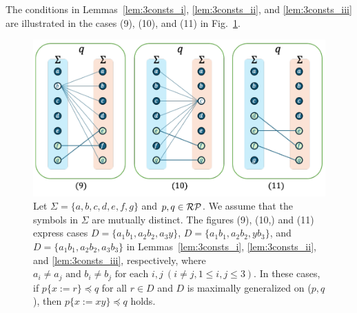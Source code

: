 The conditions in Lemmas~\ref{lem:3consts_i}, \ref{lem:3consts_ii}, and \ref{lem:3consts_iii} are illustrated in the cases (9), (10), and (11) in Fig.~\ref{fig:lem7bigraph}.

\begin{figure}[t]
  \begin{center}
    \includegraphics[scale=0.525]{figs/lem7bigraph.pdf}
    \caption{Let $\Sigma=\{a,b,c,d,e,f,g\}$ and $p,q \in \mathcal{RP}$. We assume that the symbols in $\Sigma$ are mutually distinct.
    The figures (9), (10,) and (11) express cases $D = \{ a_{1}b_{1}, a_{2}b_{2}, a_{3}y \}$, $D = \{a_{1}b_{1}, a_{2}b_{2}, yb_{3}\}$, and $D = \{ a_{1}b_{1}, a_{2}b_{2}, a_{3}b_{3} \}$ in Lemmas~\ref{lem:3consts_i}, \ref{lem:3consts_ii}, and \ref{lem:3consts_iii}, respectively, where $a_{i} \ne a_{j} \mbox{ and } b_{i} \ne b_{j} \mbox{ for each } i,j~(i\ne j, 1\le i,j\le 3)$.
    In these cases, if $p \{ x := r \} \preceq q$ for all $r \in D$ and $D$ is maximally generalized on ($p,q$), then $p \{ x := xy \} \preceq q$ holds.}\label{fig:lem7bigraph}
  \end{center}
\end{figure}


